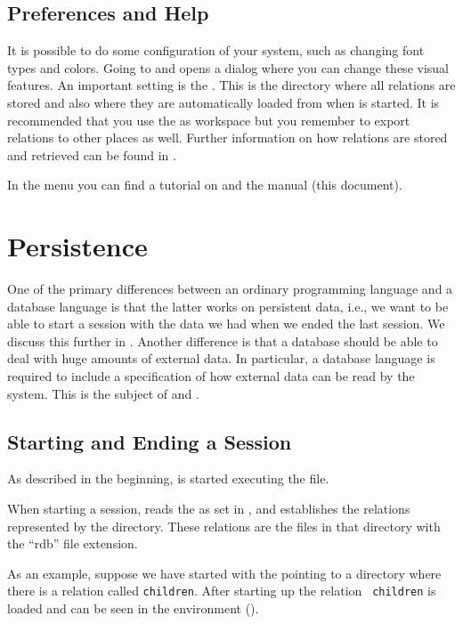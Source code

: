 \documentclass[a4,14pt,latin1]{article}
\begin{document}
\subsection{Preferences and Help}

It is possible to do some configuration of your \RAS{} system, such as
changing font types and colors. Going to  and
 opens a dialog where you can change these visual
features. An important setting is the . This is
the directory where all relations are stored and also where they are
automatically loaded from when \RAS{} is started. It is recommended
that you use the  as workspace but you remember
to export relations to other places as well. Further information on
how relations are stored and retrieved can be found in
.

In the  menu you can find a tutorial on \RAS{} and the
\RAS{} manual (this document).

\section{Persistence}
\label{persistence}
One of the primary differences between an ordinary programming
language and a database language is that the latter works on
persistent data, i.e., we want to be able to start a session with the
data we had when we ended the last session.  We discuss this further
in .  Another difference is that a
database should be able to deal with huge amounts of external data. In
particular, a database language is required to include a specification
of how external data can be read by the system. This is the subject of
 and .

\subsection{Starting and Ending a Session}
\label{startendsession}
As described in the beginning, \RAS{} is started executing the 
 file.

When starting a session, \RAS{} reads the  as
set in ,  and establishes the relations
represented by the directory. These relations are the files in that
directory with the ``rdb'' file extension.

As an example, suppose we have started \RAS{} with the
 pointing to a directory where there is a
relation called {\tt children}.  After starting up the relation {\tt
  children} is loaded and can be seen in the environment ().
\end{document}

